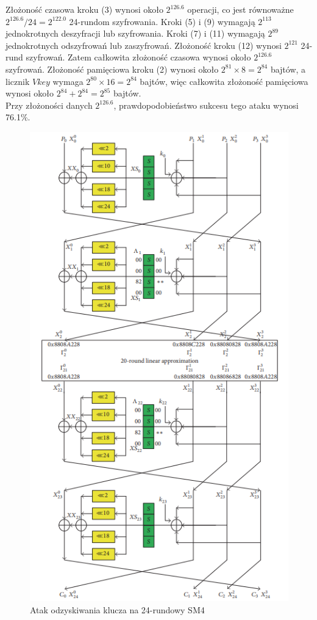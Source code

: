 Złożoność czasowa kroku (3) wynosi około $2^{126.6}$ operacji, co jest równoważne $2^{126.6}/24 = 2^{122.0}$ 24-rundom
szyfrowania. Kroki (5) i (9) wymagają $2^{113}$ jednokrotnych
deszyfracji lub szyfrowania. Kroki (7) i (11) wymagają $2^{89}$
jednokrotnych odszyfrowań lub zaszyfrowań. Złożoność
kroku (12) wynosi $2^{121}$ 24-rund szyfrowań. Zatem całkowita złożoność czasowa wynosi około $2^{126.6}$ szyfrowań.
Złożoność pamięciowa kroku (2) wynosi około $2^{81}\times8 = 2^{84}$ bajtów, a licznik $Vkey$ wymaga $2^{80}\times 16 = 2^{84}$  bajtów, więc
całkowita złożoność pamięciowa wynosi około $2^{84}+2^{84}=2^{85}$  bajtów.\\
Przy złożoności danych $2^{126.6}$, prawdopodobieństwo sukcesu tego ataku wynosi 76.1\%.

 \begin{figure}[h!]
  \centering
  \includegraphics{diagramy/KeyRecoveryAttack.png}
  \caption{Atak odzyskiwania klucza na 24-rundowy SM4}
  \label{fig:KeyRecoveryAttack}
\end{figure}
